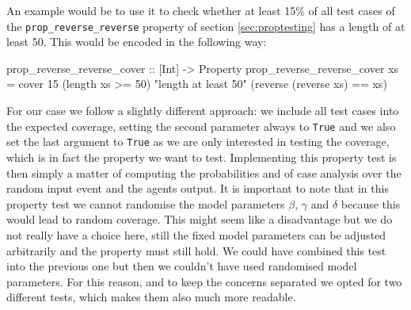 An example would be to use it to check whether at least 15\% of all test cases of the \texttt{prop\_reverse\_reverse} property of section \ref{sec:proptesting} has a length of at least 50. This would be encoded in the following way:

\begin{HaskellCode}
prop_reverse_reverse_cover :: [Int] -> Property
prop_reverse_reverse_cover xs  =  
  cover 15 (length xs >= 50) "length at least 50" (reverse (reverse xs) == xs)
\end{HaskellCode}

%

For our case we follow a slightly different approach: we include all test cases into the expected coverage, setting the second parameter always to \texttt{True} and we also set the last argument to \texttt{True} as we are only interested in testing the coverage, which is in fact the property we want to test. Implementing this property test is then simply a matter of computing the probabilities and of case analysis over the random input event and the agents output. It is important to note that in this property test we cannot randomise the model parameters $\beta$, $\gamma$ and $\delta$ because this would lead to random coverage. This might seem like a disadvantage but we do not really have a choice here, still the fixed model parameters can be adjusted arbitrarily and the property must still hold. We could have combined this test into the previous one but then we couldn't have used randomised model parameters. For this reason, and to keep the concerns separated we opted for two different tests, which makes them also much more readable. 

